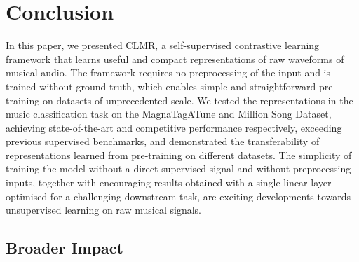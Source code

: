 \chapter{Conclusion}\label{sec:conclusion}
In this paper, we presented CLMR, a self-supervised contrastive learning framework that learns useful and compact representations of raw waveforms of musical audio.
The framework requires no preprocessing of the input and is trained without ground truth, which enables simple and straightforward pre-training on datasets of unprecedented scale.
We tested the representations in the music classification task on the MagnaTagATune and Million Song Dataset, achieving state-of-the-art and competitive performance respectively, exceeding previous supervised benchmarks, and demonstrated the transferability of representations learned from pre-training on different datasets.
The simplicity of training the model without a direct supervised signal and without preprocessing inputs, together with encouraging results obtained with a single linear layer optimised for a challenging downstream task, are exciting developments towards unsupervised learning on raw musical signals.

\section{Broader Impact}
